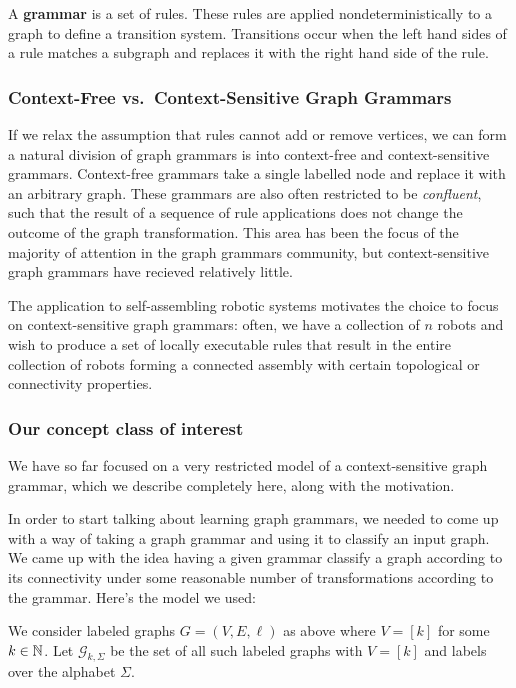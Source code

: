 \documentclass[]{article}
\def\Graphs{\mathcal{G}\xspace}
\begin{document}
A \textbf{grammar} is a set of rules. These rules are applied
nondeterministically to a graph to define a transition system.
Transitions occur when the left hand sides of a rule matches a subgraph
and replaces it with the right hand side of the rule.

\subsubsection{Context-Free vs.~Context-Sensitive Graph
Grammars}\label{context-free-vs.context-sensitive-graph-grammars}

If we relax the assumption that rules cannot add or remove vertices, we
can form a natural division of graph grammars is into context-free and
context-sensitive grammars. Context-free grammars take a single labelled
node and replace it with an arbitrary graph. These grammars are also
often restricted to be \emph{confluent}, such that the result of a
sequence of rule applications does not change the outcome of the graph
transformation. This area has been the focus of the majority of
attention in the graph grammars community, but context-sensitive graph
grammars have recieved relatively little.

The application to self-assembling robotic systems motivates the choice
to focus on context-sensitive graph grammars: often, we have a
collection of \(n\) robots and wish to produce a set of locally
executable rules that result in the entire collection of robots forming
a connected assembly with certain topological or connectivity
properties.

\subsubsection{Our concept class of
  interest}\label{our-concept-class-of-interest}

We have so far focused on a very restricted model of a context-sensitive graph grammar, which we describe completely here, along with the motivation.

In order to start talking about learning graph grammars, we needed to come up with a way of taking a graph grammar and using it to classify an input graph. We came up with the idea having a given grammar classify a graph according to its connectivity under some reasonable number of transformations according to the grammar. Here's the model we used:

We consider labeled graphs $G = (V,E,\ell)$ as above where $V = [k]$ for some $k\in \N$. Let $\Graphs_{k,\Sigma}$ be the set of all such labeled graphs with $V=[k]$ and labels over the alphabet $\Sigma$.
\end{document}
